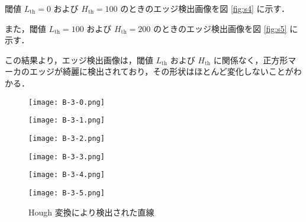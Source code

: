 \documentclass[fleqn, a4paper. 12pt]{jsarticle}
\begin{document}
      閾値 \( L_{\text{th}} = 0 \) および \( H_{\text{th}} = 100 \) のときのエッジ検出画像を図 \ref{fig:s4} に示す．

      また，閾値 \( L_{\text{th}} = 100 \) および \( H_{\text{th}} = 200 \) のときのエッジ検出画像を図 \ref{fig:s5} に示す．

      この結果より，エッジ検出画像は，閾値 \( L_{\text{th}} \) および \( H_{\text{th}} \) に関係なく，正方形マーカのエッジが綺麗に検出されており，その形状はほとんど変化しないことがわかる．

      \begin{figure}[h]
        \begin{center}
        \begin{minipage}[t]{0.48\columnwidth}
            \texttt{[image: B-3-0.png]}
            \label{fign:s5}
        \end{minipage}
        \begin{minipage}[t]{0.48\columnwidth}
            \texttt{[image: B-3-1.png]}
            \label{fign:s6}
        \end{minipage}
        \end{center}
        \begin{center}
          \begin{minipage}[t]{0.48\columnwidth}
              \texttt{[image: B-3-2.png]}
              \label{fign:s7}
          \end{minipage}
          \begin{minipage}[t]{0.48\columnwidth}
              \texttt{[image: B-3-3.png]}
              \label{fign:s8}
          \end{minipage}
        \end{center}
        \begin{center}
          \begin{minipage}[t]{0.48\columnwidth}
              \texttt{[image: B-3-4.png]}
              \label{fign:s9}
          \end{minipage}
          \begin{minipage}[t]{0.48\columnwidth}
              \texttt{[image: B-3-5.png]}
              \label{fign:s10}
          \end{minipage}
        \end{center}
        \caption{Hough 変換により検出された直線}
      \end{figure}
\end{document}
